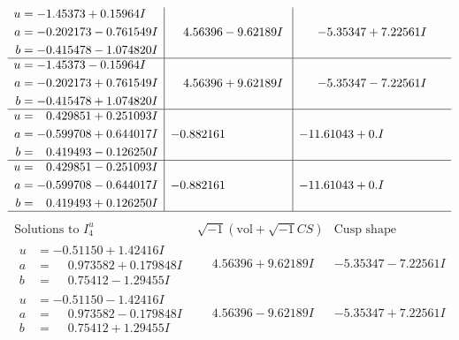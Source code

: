 \documentclass[1p]{elsarticle_modified}
\theoremstyle{definition}
\newcommand{\I}{\sqrt{-1}}
\begin{document}
$$\begin{array}{c|c|c}
\begin{aligned}
u &= -1.45373 + 0.15964 I \\
a &= -0.202173 - 0.761549 I \\
b &= -0.415478 - 1.074820 I\end{aligned}
 & \phantom{-}4.56396 - 9.62189 I & -5.35347 + 7.22561 I \\ \hline\begin{aligned}
u &= -1.45373 - 0.15964 I \\
a &= -0.202173 + 0.761549 I \\
b &= -0.415478 + 1.074820 I\end{aligned}
 & \phantom{-}4.56396 + 9.62189 I & -5.35347 - 7.22561 I \\ \hline\begin{aligned}
u &= \phantom{-}0.429851 + 0.251093 I \\
a &= -0.599708 + 0.644017 I \\
b &= \phantom{-}0.419493 - 0.126250 I\end{aligned}
 & -0.882161\phantom{ +0.000000I} & -11.61043 + 0. I\phantom{ +0.000000I} \\ \hline\begin{aligned}
u &= \phantom{-}0.429851 - 0.251093 I \\
a &= -0.599708 - 0.644017 I \\
b &= \phantom{-}0.419493 + 0.126250 I\end{aligned}
 & -0.882161\phantom{ +0.000000I} & -11.61043 + 0. I\phantom{ +0.000000I}\\
 \hline 
 \end{array}$$\newpage$$\begin{array}{c|c|c}  
\text{Solutions to }I^u_{4}& \I (\text{vol} + \sqrt{-1}CS) & \text{Cusp shape}\\
 \hline 
\begin{aligned}
u &= -0.51150 + 1.42416 I \\
a &= \phantom{-}0.973582 + 0.179848 I \\
b &= \phantom{-}0.75412 - 1.29455 I\end{aligned}
 & \phantom{-}4.56396 + 9.62189 I & -5.35347 - 7.22561 I \\ \hline\begin{aligned}
u &= -0.51150 - 1.42416 I \\
a &= \phantom{-}0.973582 - 0.179848 I \\
b &= \phantom{-}0.75412 + 1.29455 I\end{aligned}
 & \phantom{-}4.56396 - 9.62189 I & -5.35347 + 7.22561 I \\ \hline\begin{aligned}

\end{aligned}
\end{array}$$
\end{document}
